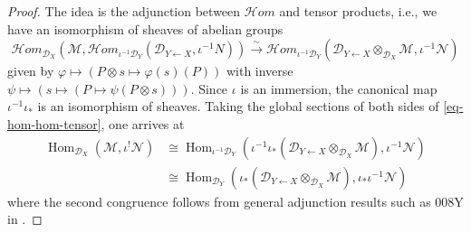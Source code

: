 \documentclass[11pt, a4paper]{article}
\theoremstyle{definition}
\newcommand{\Hom}[0]{\operatorname{Hom}}
\begin{document}
    \begin{proof}
        The idea is the adjunction between $\mathcal Hom$ and tensor products, i.e., we have an isomorphism of sheaves of abelian groups
        \begin{equation}\label{eq-hom-hom-tensor}
            \mathcal Hom_{\mathcal D_X}(\mathcal M,\mathcal Hom_{\iota^{-1}\mathcal D_Y}(\mathcal D_{Y\leftarrow X},\iota^{-1}N))\xrightarrow{\sim}\mathcal Hom_{\iota^{-1}\mathcal D_Y}(\mathcal D_{Y\leftarrow X}\otimes_{\mathcal D_X}\mathcal M, \iota^{-1}\mathcal N)
        \end{equation}
        given by $\varphi\mapsto (P\otimes s\mapsto \varphi(s)(P))$ with inverse $\psi\mapsto(s\mapsto (P\mapsto \psi(P\otimes s)))$. Since $\iota$ is an immersion, the canonical map $\iota^{-1}\iota_*$ is an isomorphism of sheaves. Taking the global sections of both sides of \cref{eq-hom-hom-tensor}, one arrives at
        \begin{align}\label{eq-hom-hom-tensor-hom-tensor}
            \Hom_{\mathcal D_X}(\mathcal M,\iota^!\mathcal N)&\cong\Hom_{\iota^{-1}\mathcal D_Y}(\iota^{-1}\iota_*(\mathcal D_{Y\leftarrow X}\otimes_{\mathcal D_X}\mathcal M), \iota^{-1}\mathcal N)\\
            &\cong\Hom_{\mathcal D_Y}(\iota_*(\mathcal D_{Y\leftarrow X}\otimes_{\mathcal D_X}\mathcal M),\iota_*\iota^{-1}\mathcal N)
        \end{align}
        where the second congruence follows from general adjunction results such as 008Y in \cite{stacks-project}.
        

\end{proof}
\end{document}
